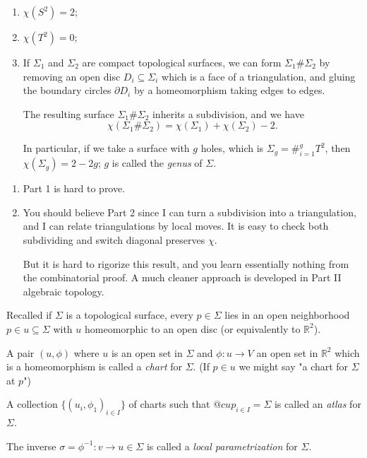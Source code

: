 \begin{example}
    \leavevmode
    \begin{enumerate}
        \item \(\chi(S^2) = 2\);
        \item \(\chi(T^2) = 0\);
        \item If \(\Sigma_1\) and \(\Sigma_{2}\) are compact topological surfaces, we can form \(\Sigma_1 \# \Sigma_2\) by removing an open disc \(D_i \subseteq \Sigma_i\) which is a face of a triangulation, and gluing the boundary circles \(\partial D_i\) by a homeomorphism taking edges to edges.
        
        The resulting surface \(\Sigma_1 \# \Sigma_2\) inherits a subdivision, and we have
        \[
            \chi (\Sigma_1 \# \Sigma_2) = \chi(\Sigma_1) + \chi(\Sigma_{2}) - 2.
        \]

        In particular, if we take a surface with \(g\) holes, which is \(\Sigma_g = \#^{g}_{i=1}T^2\), then \(\chi(\Sigma_g) = 2 - 2g\); \(g\) is called the \textit{genus} of \(\Sigma\).
    \end{enumerate}
\end{example}
\begin{remark}
    \leavevmode
    \begin{enumerate}
        \item Part 1 is hard to prove.
        \item You should believe Part 2 since I can turn a subdivision into a triangulation, and I can relate triangulations by local moves. It is easy to check both subdividing and switch diagonal preserves \(\chi\).

        But it is hard to rigorize this result, and you learn essentially nothing from the combinatorial proof. A much cleaner approach is developed in Part II algebraic topology.
    \end{enumerate}
\end{remark}
Recalled if \(\Sigma\) is a topological surface, every \(p \in \Sigma\) lies in an open neighborhood \(p \in u \subseteq \Sigma\) with \(u\) homeomorphic to an open disc (or equivalently to \(\mathbb{R}^2\)).
\begin{definition}
    A pair \((u, \phi)\) where \(u\) is an open set in \(\Sigma\) and \(\phi : u \to V \) an open set in \(\mathbb{R}^2\) which is a homeomorphism is called a \textit{chart} for \(\Sigma\). (If \(p\in u\) we might say "a chart for \(\Sigma\) at \(p\)")

    A collection \(\{(u_i, \phi_1)_{i\in I}\}\) of charts such that \(@cup_{i\in I} = \Sigma\) is called an \textit{atlas} for \(\Sigma\).

    The inverse \(\sigma = \phi^{-1}:v \to u \in \Sigma\) is called a \textit{local parametrization} for \(\Sigma\).
\end{definition}
